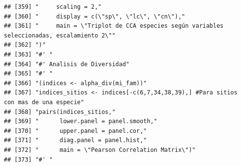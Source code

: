 \documentclass[11pt,]{article}
\begin{document}
\begin{verbatim}
## [359] "     scaling = 2,"                                                                                                                                                     
## [360] "     display = c(\"sp\", \"lc\", \"cn\"),"                                                                                                                             
## [361] "     main = \"Triplot de CCA especies según variables seleccionadas, escalamiento 2\""                                                                                 
## [362] ")"                                                                                                                                                                     
## [363] "#' "                                                                                                                                                                   
## [364] "#' Analisis de Diversidad"                                                                                                                                             
## [365] "#' "                                                                                                                                                                   
## [366] "(indices <- alpha_div(mi_fam))"                                                                                                                                        
## [367] "indices_sitios <- indices[-c(6,7,34,38,39),] #Para sitios con mas de una especie"                                                                                      
## [368] "pairs(indices_sitios,"                                                                                                                                                 
## [369] "      lower.panel = panel.smooth,"                                                                                                                                     
## [370] "      upper.panel = panel.cor,"                                                                                                                                        
## [371] "      diag.panel = panel.hist,"                                                                                                                                        
## [372] "      main = \"Pearson Correlation Matrix\")"                                                                                                                          
## [373] "#' "                                                                                                                                                                   

\end{verbatim}
\end{document}
